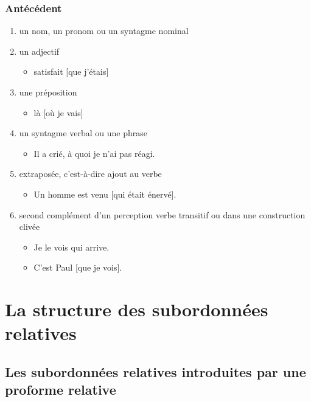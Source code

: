 \documentclass[UTF8]{report}
\begin{document}
\subsubsection{Antécédent}
\begin{enumerate}
    \item un nom, un pronom ou un syntagme nominal
    \item un adjectif
    \begin{itemize}
        \item satisfait [que j’étais]
    \end{itemize}
    \item une préposition 
    \begin{itemize}
        \item là [où je vais]
    \end{itemize}
    \item un syntagme verbal ou une phrase
    \begin{itemize}
        \item Il a crié, à quoi je n’ai pas réagi.
    \end{itemize}
    \item extraposée, c’est-à-dire ajout au verbe
    \begin{itemize}
        \item Un homme est venu [qui était énervé].
    \end{itemize}
    \item second complément d’un perception verbe transitif ou dans une construction clivée
    \begin{itemize}
        \item Je le vois qui arrive.
        \item C’est Paul [que je vois].
    \end{itemize}
\end{enumerate}

\section{La structure des subordonnées relatives}
\subsection{Les subordonnées relatives introduites par une proforme relative}
\end{document}
